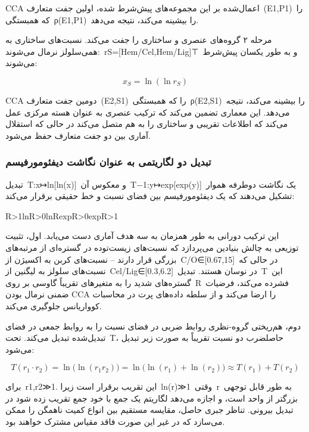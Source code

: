 \documentclass[12pt, a4paper]{article}
\begin{document}
CCA اعمال‌شده بر این مجموعه‌های پیش‌شرط شده، اولین جفت متعارف (E1,P1) را که همبستگی ρ(E1,P1) را بیشینه می‌کند، نتیجه می‌دهد.

مرحله ۲ گروه‌های عنصری و ساختاری را جفت می‌کند. نسبت‌های ساختاری به همی‌سلولز نرمال می‌شوند: rS=[Hem/Cel,Hem/Lig]⊤ و به طور یکسان پیش‌شرط می‌شوند:

\begin{equation}
x_{S}=\ln(\ln r_{S})
\end{equation}

CCA دومین جفت متعارف (E2,S1) را که همبستگی ρ(E2,S1) را بیشینه می‌کند، نتیجه می‌دهد. این معماری تضمین می‌کند که ترکیب عنصری به عنوان هسته مرکزی عمل می‌کند که اطلاعات تقریبی و ساختاری را به هم متصل می‌کند در حالی که استقلال آماری بین دو جفت متعارف حفظ می‌شود.

\subsubsection{تبدیل دو لگاریتمی به عنوان نگاشت دیفئومورفیسم}

تبدیل T:x↦ln[ln(x)] و معکوس آن T−1:y↦exp[exp(y)] یک نگاشت دوطرفه هموار تشکیل می‌دهند که یک دیفئومورفیسم بین فضای نسبت و خط حقیقی برقرار می‌کند:

R>1lnR>0lnRexpR>0expR>1

این ترکیب دورانی به طور همزمان به سه هدف آماری دست می‌یابد. اول، تثبیت توزیعی به چالش بنیادین می‌پردازد که نسبت‌های زیست‌توده در گستره‌ای از مرتبه‌های بزرگی قرار دارند – نسبت‌های کربن به اکسیژن از C/O∈[0.67,15] در حالی که نسبت‌های سلولز به لیگنین از Cel/Lig∈[0.3,6.2] در نوسان هستند. تبدیل T این گستره‌های شدید را به متغیرهای تقریباً گاوسی بر روی R فشرده می‌کند، فرضیات ضمنی نرمال بودن CCA را ارضا می‌کند و از سلطه داده‌های پرت در محاسبات کوواریانس جلوگیری می‌کند.

دوم، هم‌ریختی گروه-نظری روابط ضربی در فضای نسبت را به روابط جمعی در فضای تبدیل‌شده تبدیل می‌کند. تحت T، حاصلضرب دو نسبت تقریباً به صورت زیر تبدیل می‌شود:

\begin{equation}
T(r_{1}\cdot r_{2})=\ln\!\bigl(\ln(r_{1}r_{2})\bigr)=\ln\!\bigl(\ln(r_{1})+\ln(r_{2})\bigr)\approx T(r_{1})+T(r_{2})
\end{equation}

برای r1,r2≫1. این تقریب برقرار است زیرا ln(r)≫1 وقتی r به طور قابل توجهی بزرگتر از واحد است، و اجازه می‌دهد لگاریتم یک جمع با خود جمع تقریب زده شود در تبدیل بیرونی. تناظر جبری حاصل، مقایسه مستقیم بین انواع کمیت ناهمگن را ممکن می‌سازد که در غیر این صورت فاقد مقیاس مشترک خواهند بود.
\end{document}
